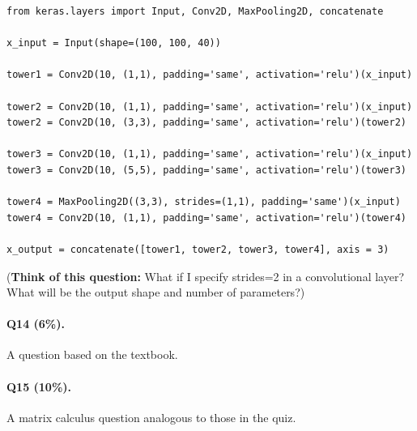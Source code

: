\documentclass[11pt]{article}
\numberwithin{equation}{section}
\begin{document}
\begin{lstlisting}
from keras.layers import Input, Conv2D, MaxPooling2D, concatenate

x_input = Input(shape=(100, 100, 40))

tower1 = Conv2D(10, (1,1), padding='same', activation='relu')(x_input)

tower2 = Conv2D(10, (1,1), padding='same', activation='relu')(x_input)
tower2 = Conv2D(10, (3,3), padding='same', activation='relu')(tower2)

tower3 = Conv2D(10, (1,1), padding='same', activation='relu')(x_input)
tower3 = Conv2D(10, (5,5), padding='same', activation='relu')(tower3)

tower4 = MaxPooling2D((3,3), strides=(1,1), padding='same')(x_input)
tower4 = Conv2D(10, (1,1), padding='same', activation='relu')(tower4)

x_output = concatenate([tower1, tower2, tower3, tower4], axis = 3)
\end{lstlisting}
\vspace{3mm}



\noindent
(\textbf{Think of this question:} What if I specify \textsf{strides=2} in a convolutional layer? 
What will be the output shape and number of parameters?)



\paragraph{Q14 (6\%).} 
A question based on the textbook.



\paragraph{Q15 (10\%).} 
A matrix calculus question analogous to those in the quiz.




%

%
%
%
\end{document}
